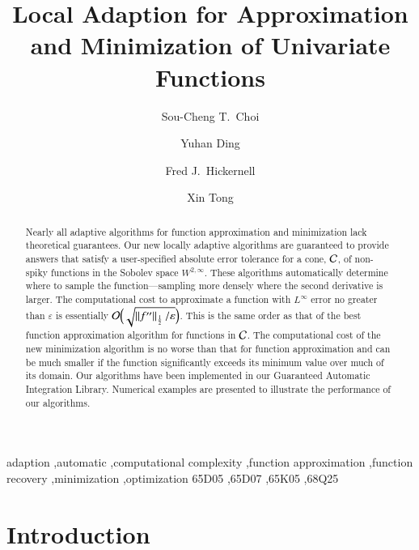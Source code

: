 \documentclass[review]{elsarticle}
\newcommand{\abstol}{\varepsilon}
\theoremstyle{definition}
\renewcommand{\cw}{W}
\begin{document}
\begin{frontmatter}

\title{Local Adaption for Approximation and Minimization of Univariate Functions}


\author{Sou-Cheng T.~Choi}
\author{Yuhan Ding}
\author{Fred J.~Hickernell}
\address{Department of Applied Mathematics, Illinois Institute of Technology, RE 208, 10 West 32$^{\text{nd}}$ Street, Chicago, Illinois, 60616, USA}
\author{Xin Tong}
\address{Department of Mathematics, Statistics, and Computer Science, University of Illinois at Chicago, Room 322 SEO, 851 S. Morgan Street, Chicago, Illinois, 60607, USA}



\begin{abstract}
Nearly all adaptive algorithms for function approximation and minimization lack theoretical guarantees.  Our new locally adaptive algorithms are guaranteed to provide answers that satisfy a user-specified absolute error tolerance for a cone, $\mathcal{C}$, of non-spiky functions in the Sobolev space $\cw^{2,\infty}$.  These algorithms automatically determine where to sample the function---sampling more densely where the second derivative is larger.  The computational cost to approximate a function with $L^{\infty}$ error no greater than $\abstol$ is essentially $\Order\Bigl(\sqrt{\norm[\frac12]{f''}/\abstol}\Bigr)$.  This is the same order as that of the best function approximation algorithm for functions in $\mathcal{C}$. The computational cost of the new minimization algorithm is no worse than that for function approximation and can be much smaller if the function significantly exceeds its minimum value over much of its domain.  Our  algorithms have been implemented in our Guaranteed Automatic Integration Library.  Numerical examples are presented to illustrate the performance of our algorithms.
\end{abstract}

\begin{keyword}
adaption \sep automatic \sep computational complexity \sep function approximation \sep function recovery \sep minimization \sep optimization
\MSC[2010]  65D05 \sep 65D07 \sep 65K05 \sep 68Q25
\end{keyword}

\end{frontmatter}

\section{Introduction} \label{sec:intro}
\end{document}

